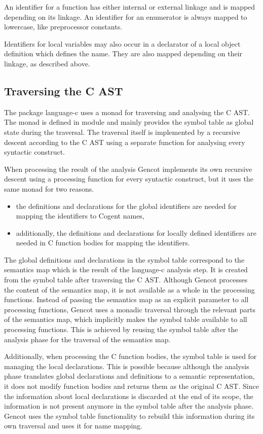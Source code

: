 An identifier for a function has either internal or external linkage and is mapped depending on its linkage.
An identifier for an enumerator is always mapped to lowercase, like preprocessor constants.

Identifiers for local variables may also occur in a declarator of a local object definition which defines 
the name. They are also mapped depending on their linkage, as described above.

\subsection{Traversing the C AST}
\label{impl-ccode-trav}

The package language-c uses a monad for traversing and analysing the C AST. The monad is defined in module 
 and mainly provides the symbol table as global state during the traversal.
The traversal itself is implemented by a recursive descent according to the C AST using a separate function
for analysing every syntactic construct.

When processing the result of the analysis Gencot implements its own recursive descent using a processing
function for every syntactic construct, but it uses the same monad for two reasons.
\begin{itemize}
\item the definitions and declarations for the global identifiers are needed for mapping the identifiers to
Cogent names,
\item additionally, the definitions and declarations for locally defined identifiers are needed in C function
bodies for mapping the identifiers.
\end{itemize}

The global definitions and declarations in the symbol table correspond to the semantics map which is the result 
of the language-c analysis step. It is created from the symbol table after traversing the C AST. Although Gencot 
processes the content of the semantics map, it is not available as a whole in the processing functions. Instead
of passing the semantics map as an explicit parameter to all processing functions, Gencot uses a monadic traversal
through the relevant parts of the semantics map, which implicitly makes the symbol table available to all 
processing functions. This is achieved by reusing the symbol table after the analysis phase for the traversal
of the semantics map.

Additionally, when processing the C function bodies, the symbol table is used for managing the local declarations. 
This is possible because although the analysis phase translates global declarations and definitions to a 
semantic representation, it does not modify function bodies and returns them as the original C AST. Since
the information about local declarations is discarded at the end of its scope, the information is not 
present anymore in the symbol table after the analysis phase. Gencot uses the symbol table functionality
to rebuild this information during its own traversal and uses it for name mapping.

